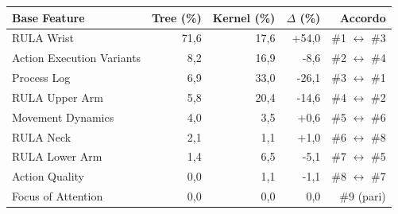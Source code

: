 \begin{tabular*}{\linewidth}{@{}l@{\extracolsep{\fill}}rrrr@{}}
\toprule
\textbf{Base Feature} & \textbf{Tree (\%)} & \textbf{Kernel (\%)} & \textbf{$\Delta$ (\%)} & \textbf{Accordo} \\
\midrule
RULA Wrist & 71{,}6 & 17{,}6 & +54{,}0 & \#1 $\leftrightarrow$ \#3 \\
Action Execution Variants & 8{,}2 & 16{,}9 & -8{,}6 & \#2 $\leftrightarrow$ \#4 \\
Process Log & 6{,}9 & 33{,}0 & -26{,}1 & \#3 $\leftrightarrow$ \#1 \\
RULA Upper Arm & 5{,}8 & 20{,}4 & -14{,}6 & \#4 $\leftrightarrow$ \#2 \\
Movement Dynamics & 4{,}0 & 3{,}5 & +0{,}6 & \#5 $\leftrightarrow$ \#6 \\
RULA Neck & 2{,}1 & 1{,}1 & +1{,}0 & \#6 $\leftrightarrow$ \#8 \\
RULA Lower Arm & 1{,}4 & 6{,}5 & -5{,}1 & \#7 $\leftrightarrow$ \#5 \\
Action Quality & 0{,}0 & 1{,}1 & -1{,}1 & \#8 $\leftrightarrow$ \#7 \\
Focus of Attention & 0{,}0 & 0{,}0 & 0{,}0 & \#9 (pari) \\
\bottomrule
\end{tabular*}
